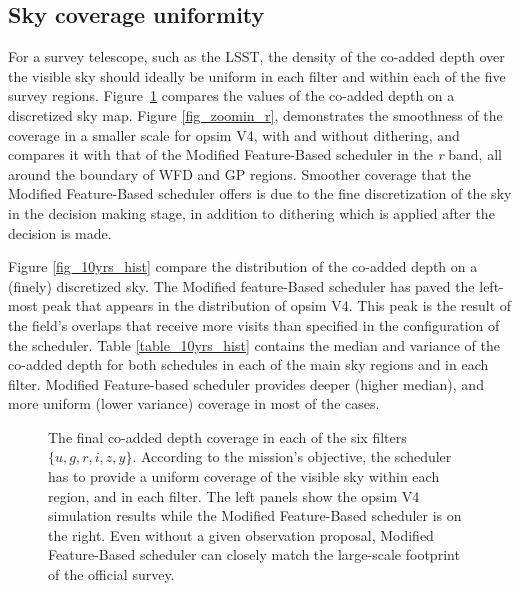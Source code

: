 \documentclass[12pt]{aastex62}
\theoremstyle{definition}
\begin{document}
\subsection{Sky coverage uniformity}
For a survey telescope, such as the LSST, the density of the co-added depth over the visible sky should ideally be uniform in each filter and within each of the five survey regions. Figure~\ref{fig_10yrs_skymap} compares the values of the co-added depth on a discretized sky map. Figure \ref{fig_zoomin_r}, demonstrates the smoothness of the coverage in a smaller scale for opsim V4, with and without dithering, and compares it with that of the Modified Feature-Based scheduler in the \textit{r} band, all around the boundary of WFD and GP regions. Smoother coverage that the Modified Feature-Based scheduler offers is due to the fine discretization of the sky in the decision making stage, in addition to dithering which is applied after the decision is made.

Figure \ref{fig_10yrs_hist} compare the distribution of the co-added depth on a (finely) discretized sky. The Modified feature-Based scheduler has paved the left-most peak that appears in the distribution of opsim V4. This peak is the result of the field's overlaps that receive more visits than specified in the configuration of the scheduler. Table \ref{table_10yrs_hist} contains the median and variance of the co-added depth for both schedules in each of the main sky regions and in each filter. Modified Feature-based scheduler provides deeper (higher median), and more uniform (lower variance) coverage in most of the cases.

\begin{figure}[h!]
\caption{The final co-added depth coverage in each of the six filters $\{ u, g, r, i, z, y\}$. According to the mission's objective, the scheduler has to provide a uniform coverage of the visible sky within each region, and in each filter. The left panels show the opsim V4 simulation results while the Modified Feature-Based scheduler is on the right. Even without a given observation proposal, Modified Feature-Based scheduler can closely match the large-scale footprint of the official survey.}
\label{fig_10yrs_skymap}
\end{figure}
\end{document}

